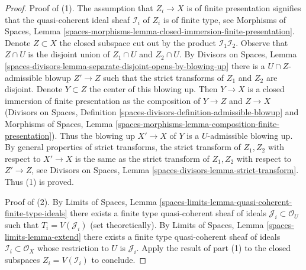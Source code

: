 \documentclass[10pt,a4paper]{amsart}
\theoremstyle{plain}
\theoremstyle{definition}
\theoremstyle{remark}
\numberwithin{equation}{subsection}
\begin{document}
\begin{proof}
Proof of (1). The assumption that $Z_i \to X$ is of finite presentation
signifies that the quasi-coherent ideal sheaf $\mathcal{I}_i$ of $Z_i$
is of finite type, see 
Morphisms of Spaces, Lemma
\ref{spaces-morphisms-lemma-closed-immersion-finite-presentation}.
Denote $Z \subset X$ the closed subspace
cut out by the product $\mathcal{I}_1 \mathcal{I}_2$.
Observe that $Z \cap U$ is the disjoint union
of $Z_1 \cap U$ and $Z_2 \cap U$. By Divisors on Spaces, Lemma
\ref{spaces-divisors-lemma-separate-disjoint-opens-by-blowing-up}
there is a $U \cap Z$-admissible blowup $Z' \to Z$ such that
the strict transforms of $Z_1$ and $Z_2$ are disjoint.
Denote $Y \subset Z$ the center of this blowing up.
Then $Y \to X$ is a closed immersion of finite presentation as the composition
of $Y \to Z$ and $Z \to X$ (Divisors on Spaces, Definition
\ref{spaces-divisors-definition-admissible-blowup} and
Morphisms of Spaces, Lemma
\ref{spaces-morphisms-lemma-composition-finite-presentation}).
Thus the blowing up $X' \to X$ of $Y$ is a $U$-admissible blowing
up. By general properties of strict transforms, the
strict transform of $Z_1, Z_2$ with respect to $X' \to X$
is the same as the strict transform of $Z_1, Z_2$ with respect
to $Z' \to Z$, see
Divisors on Spaces, Lemma \ref{spaces-divisors-lemma-strict-transform}.
Thus (1) is proved.

\medskip\noindent
Proof of (2). By Limits of Spaces, Lemma
\ref{spaces-limits-lemma-quasi-coherent-finite-type-ideals}
there exists a finite type quasi-coherent sheaf of ideals
$\mathcal{J}_i \subset \mathcal{O}_U$ such that
$T_i = V(\mathcal{J}_i)$ (set theoretically).
By Limits of Spaces, Lemma \ref{spaces-limits-lemma-extend}
there exists a finite type quasi-coherent sheaf
of ideals $\mathcal{I}_i \subset \mathcal{O}_X$
whose restriction to $U$ is $\mathcal{J}_i$.
Apply the result of part (1) to the closed
subspaces $Z_i = V(\mathcal{I}_i)$ to conclude.
\end{proof}
\end{document}

